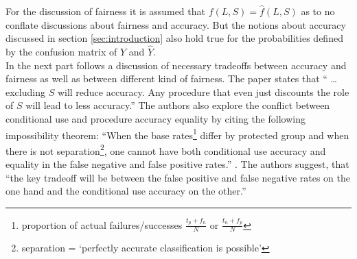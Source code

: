 
For the discussion of fairness it is assumed that $f(L,S) = \hat{f}(L,S)$ as to no 
conflate discussions about fairness and accuracy. But the notions about accuracy discussed 
in section \ref{sec:introduction} also hold true for the probabilities defined by the 
confusion matrix of $Y$ and $\hat{Y}$. \\

In the next part follows a discussion of necessary tradeoffs between accuracy and 
fairness as well as between different kind of fairness. The paper states that \enquote{
\dots excluding $S$ will reduce accuracy. Any procedure that even just discounts the role 
of $S$ will lead to less accuracy.}\cite{Berk.2018} The authors also explore the conflict 
between conditional use and procedure accuracy equality by citing the following impossibility 
theorem: \enquote{When the base rates\footnote{proportion of actual failures/successes 
$\frac{t_p + f_n}{N}$ or $\frac{t_n + f_p}{N}$} differ by protected group and when there 
is not separation\footnote{separation = \enquote{perfectly accurate classification is 
possible}\cite{Berk.2018}}, one cannot have both conditional use accuracy and equality in 
the false negative and false positive rates.}\cite{DBLP:journals/corr/KleinbergMR16}
\cite{Chouldechova2017FairPW}. The authors suggest, that \enquote{the key tradeoff will be 
between the false positive and false negative rates on the one hand and the conditional use 
accuracy on the other.}\cite{Berk.2018}\\

